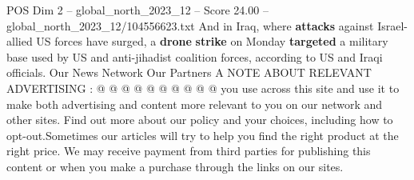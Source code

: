 \begin{textsample}{POS Dim 2 – global\_north\_2023\_12 – Score 24.00 – global\_north\_2023\_12/104556623.txt}
And in Iraq, where \textbf{attacks} against Israel-allied US forces have surged, a \textbf{drone} \textbf{strike} on Monday \textbf{targeted} a military base used by US and anti-jihadist coalition forces, according to US and Iraqi officials.
Our News Network Our Partners A NOTE ABOUT RELEVANT ADVERTISING : @ @ @ @ @ @ @ @ @ @ you use across this site and use it to make both advertising and content more relevant to you on our network and other sites.
Find out more about our policy and your choices, including how to opt-out.Sometimes our articles will try to help you find the right product at the right price.
We may receive payment from third parties for publishing this content or when you make a purchase through the links on our sites.

\end{textsample}
